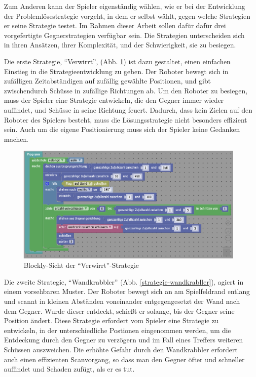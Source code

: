 Zum Anderen kann der Spieler eigenständig wählen, wie er bei der Entwicklung der
Problemlösestrategie vorgeht, in dem er selbst wählt, gegen welche Strategien er seine Strategie
testet. Im Rahmen dieser Arbeit sollen dafür dafür drei vorgefertigte Gegnerstrategien verfügbar
sein. Die Strategien unterscheiden sich in ihren Ansätzen, ihrer Komplexität, und der Schwierigkeit,
sie zu besiegen.

Die erste Strategie, \enquote{Verwirrt}, (Abb. \ref{strategie-verwirrt}) ist dazu gestaltet, einen
einfachen Einstieg in die Strategieentwicklung zu geben. Der Roboter bewegt sich in zufälligen
Zeitabständigen auf zufällig gewählte Positionen, und gibt zwischendurch Schüsse in zufällige
Richtungen ab. Um den Roboter zu besiegen, muss der Spieler eine Strategie entwickeln, die den
Gegner immer wieder auffindet, und Schüsse in seine Richtung feuert. Dadurch, dass kein
Zielen auf den Roboter des Spielers besteht, muss die Lösungsstrategie nicht besonders effizient
sein. Auch um die eigene Positionierung muss sich der Spieler keine Gedanken machen.

\begin{figure}
  \centering
  \label{strategie-verwirrt}
  \includegraphics[scale=1, keepaspectratio]{figures/strategy-verwirrt.png}
  \caption{Blockly-Sicht der \enquote{Verwirrt}-Strategie}
\end{figure}

Die zweite Strategie, \enquote{Wandkrabbler} (Abb. \ref{strategie-wandkrabller}), agiert in einem
vorsehbaren Muster. Der Roboter bewegt sich an am Spielfeldrand entlang und scannt in kleinen
Abständen voneinander entgegengesetzt der Wand nach dem Gegner. Wurde dieser entdeckt, schießt er
solange, bis der Gegner seine Position ändert. Diese Strategie erfordert vom Spieler eine Strategie
zu entwickeln, in der unterschiedliche Postionen eingenommen werden, um die Entdeckung durch den
Gegner zu verzögern und im Fall eines Treffers weiteren Schüssen auszweichen. Die erhöhte Gefahr
durch den Wandkrabbler erfordert auch einen effizienten Scanvorgang, so dass man den Gegner öfter
und schneller auffindet und Schaden zufügt, als er es tut.

